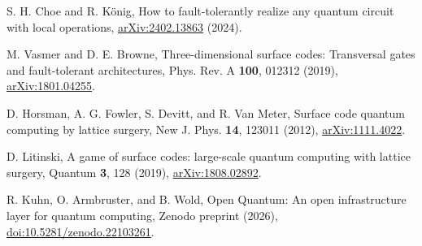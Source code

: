 S. H. Choe and R. K\"onig, How to fault-tolerantly realize any quantum circuit with local operations, \href{https://arxiv.org/abs/2402.13863}{arXiv:2402.13863} (2024).

M. Vasmer and D. E. Browne, Three-dimensional surface codes: Transversal gates and fault-tolerant architectures, Phys. Rev. A \textbf{100}, 012312 (2019), \href{https://arxiv.org/abs/1801.04255}{arXiv:1801.04255}.

D. Horsman, A. G. Fowler, S. Devitt, and R. Van Meter, Surface code quantum computing by lattice surgery, New J. Phys. \textbf{14}, 123011 (2012), \href{https://arxiv.org/abs/1111.4022}{arXiv:1111.4022}.

D. Litinski, A game of surface codes: large-scale quantum computing with lattice surgery, Quantum \textbf{3}, 128 (2019), \href{https://arxiv.org/abs/1808.02892}{arXiv:1808.02892}.

R. Kuhn, O. Armbruster, and B. Wold, Open Quantum: An open infrastructure layer for quantum computing, Zenodo preprint (2026), \href{https://doi.org/10.5281/zenodo.22103261}{doi:10.5281/zenodo.22103261}.
